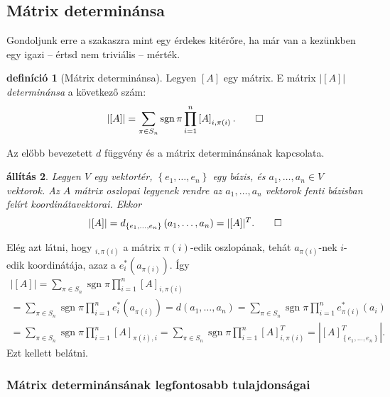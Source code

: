 \documentclass[a4paper, showtrims]{memoir}
\makeatletter
\renewenvironment{proof}[1][\proofname]
    {\par\pushQED{\qed}%
    \normalfont \topsep6\p@\@plus6\p@\relax
    \trivlist
    \item[\hskip\labelsep
        \itshape
    #1\@addpunct{:}]\ignorespaces}
    {\popQED\endtrivlist\@endpefalse}
\theoremstyle{plain}
\newtheorem{proposition}{állítás}[chapter]
\theoremstyle{remark}
\theoremstyle{definition}
\newtheorem{definition}[proposition]{definíció}
\DeclareMathOperator{\sgn}{sgn}
\makeatother
\begin{document}
\subsection{Mátrix determinánsa}
Gondoljunk erre a szakaszra mint egy érdekes kitérőre,
ha már van a kezünkben egy igazi -- értsd nem triviális -- mérték.
\begin{definition}[Mátrix determinánsa]
	Legyen
	$\left[ A\right]$ egy mátrix.
	E mátrix $\left| \left[ A\right] \right|$ \emph{determinánsa} a következő szám:
	\[
		\left| \left[ A\right] \right|
		=
		\sum_{\pi \in S_{n}}\sgn\pi\prod_{i=1}^n\left[ A\right]_{i,\pi \left( i\right) }.\qedhere
	\]
\end{definition}
Az előbb bevezetett $d$ függvény és a mátrix determinánsának kapcsolata.
\begin{proposition}
	Legyen $V$ egy vektortér,  $\left\{ e_1,\ldots,e_n \right\}$ egy bázis,
	és $a_1,\ldots,a_n\in V$ vektorok.
	Az $A$ mátrix oszlopai legyenek rendre az
	$a_1,\ldots,a_n$ vektorok fenti bázisban felírt koordinátavektorai.
	Ekkor
	\[
		|[A]|
		=
		d_{\left\{e_1,\ldots,e_n \right\}}\left( a_1,\ldots,a_n \right)
		=
		|[A]|^T.\qedhere
	\]
\end{proposition}
\begin{proof}
	Elég azt látni, hogy
	\begin{math}
		[A]_{i,\pi(i)}
	\end{math}
	a mátrix $\pi(i)$-edik oszlopának, tehát $a_{\pi(i)}$-nek $i$-edik koordinátája, azaz
	a
	\begin{math}
		e_i^\ast\left( a_{\pi(i)} \right).
	\end{math}
	Így
	\begin{multline*}
		|[A]|
		=
		\sum_{\pi \in S_{n}}\sgn\pi\prod_{i=1}^n\left[ A\right]_{i,\pi \left( i\right) }
		\\
		=
		\sum_{\pi \in S_{n}}\sgn\pi\prod_{i=1}^ne_i^\ast\left( a_{\pi(i)} \right)
		=
		d\left( a_1,\ldots,a_n \right)
		=
		\sum_{\pi \in S_{n}}\sgn\pi\prod_{i=1}^ne_{\pi(i)}^\ast\left( a_i \right)
		\\
		=
		\sum_{\pi \in S_{n}}\sgn\pi\prod_{i=1}^n\left[ A\right]_{\pi \left( i\right),i }
		=
		\sum_{\pi \in S_{n}}\sgn\pi\prod_{i=1}^n\left[ A\right]^T_{i,\pi \left( i\right)}
		=
		|[A]^T_{\left\{e_1,\ldots,e_n \right\}}|.
	\end{multline*}
	Ezt kellett belátni.
\end{proof}

\subsubsection{Mátrix determinánsának legfontosabb tulajdonságai}
\end{document}
